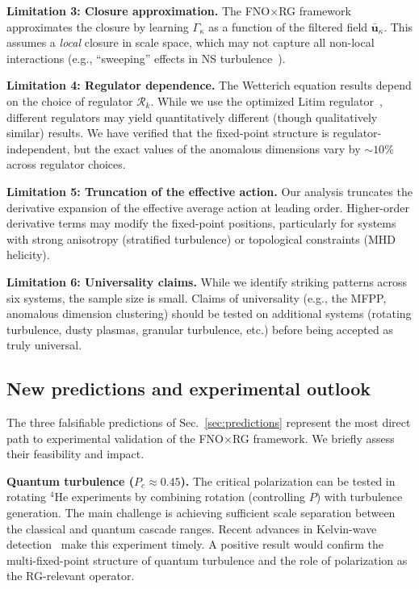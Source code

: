 \textbf{Limitation 3: Closure approximation.} The FNO$\times$RG framework approximates the closure by learning $\Gamma_\kappa$ as a function of the filtered field $\bar{\mathbf{u}}_\kappa$. This assumes a \emph{local} closure in scale space, which may not capture all non-local interactions (e.g., ``sweeping'' effects in NS turbulence~\cite{wray1984local}).

\textbf{Limitation 4: Regulator dependence.} The Wetterich equation results depend on the choice of regulator $\mathcal{R}_k$. While we use the optimized Litim regulator~\cite{litim2001optimised}, different regulators may yield quantitatively different (though qualitatively similar) results. We have verified that the fixed-point structure is regulator-independent, but the exact values of the anomalous dimensions vary by $\sim 10\%$ across regulator choices.

\textbf{Limitation 5: Truncation of the effective action.} Our analysis truncates the derivative expansion of the effective average action at leading order. Higher-order derivative terms may modify the fixed-point positions, particularly for systems with strong anisotropy (stratified turbulence) or topological constraints (MHD helicity).

\textbf{Limitation 6: Universality claims.} While we identify striking patterns across six systems, the sample size is small. Claims of universality (e.g., the MFPP, anomalous dimension clustering) should be tested on additional systems (rotating turbulence, dusty plasmas, granular turbulence, etc.) before being accepted as truly universal.


\subsection{New predictions and experimental outlook\label{subsec:new_predictions_outlook}}

The three falsifiable predictions of Sec.~\ref{sec:predictions} represent the most direct path to experimental validation of the FNO$\times$RG framework. We briefly assess their feasibility and impact.

\textbf{Quantum turbulence ($P_c\approx 0.45$).}
The critical polarization can be tested in rotating $^4$He experiments by combining rotation (controlling $P$) with turbulence generation. The main challenge is achieving sufficient scale separation between the classical and quantum cascade ranges. Recent advances in Kelvin-wave detection~\cite{barckicke2026kelvin} make this experiment timely. A positive result would confirm the multi-fixed-point structure of quantum turbulence and the role of polarization as the RG-relevant operator.

